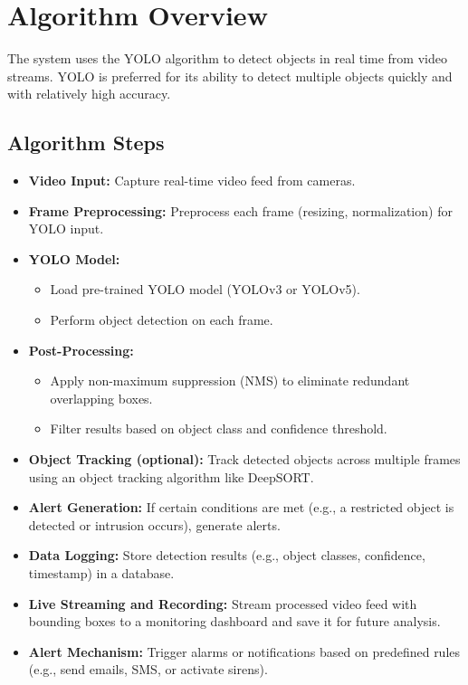 \documentclass[openany,12pt]{report}
\begin{document}
\usepackage{amsmath}


\section*{Algorithm Overview}
The system uses the YOLO algorithm to detect objects in real time from video streams. YOLO is preferred for its ability to detect multiple objects quickly and with relatively high accuracy.

\subsection*{Algorithm Steps}
\begin{itemize}
    \item \textbf{Video Input:} Capture real-time video feed from cameras.
    
    \item \textbf{Frame Preprocessing:} Preprocess each frame (resizing, normalization) for YOLO input.
    
    \item \textbf{YOLO Model:}
    \begin{itemize}
        \item Load pre-trained YOLO model (YOLOv3 or YOLOv5).
        \item Perform object detection on each frame.
    \end{itemize}
    
    \item \textbf{Post-Processing:}
    \begin{itemize}
        \item Apply non-maximum suppression (NMS) to eliminate redundant overlapping boxes.
        \item Filter results based on object class and confidence threshold.
    \end{itemize}
    
    \item \textbf{Object Tracking (optional):} Track detected objects across multiple frames using an object tracking algorithm like DeepSORT.
    
    \item \textbf{Alert Generation:} If certain conditions are met (e.g., a restricted object is detected or intrusion occurs), generate alerts.
    
    \item \textbf{Data Logging:} Store detection results (e.g., object classes, confidence, timestamp) in a database.
    
    \item \textbf{Live Streaming and Recording:} Stream processed video feed with bounding boxes to a monitoring dashboard and save it for future analysis.
    
    \item \textbf{Alert Mechanism:} Trigger alarms or notifications based on predefined rules (e.g., send emails, SMS, or activate sirens).
\end{itemize}
\end{document}
